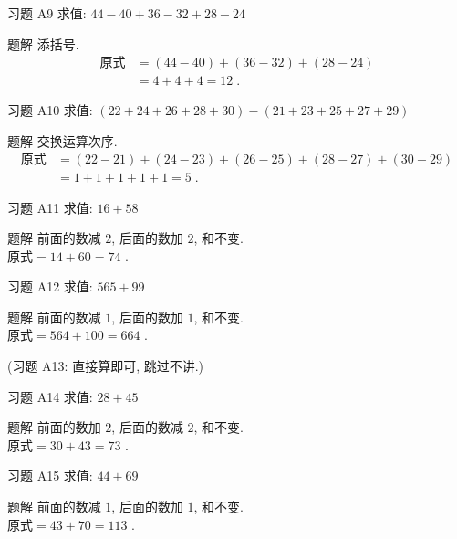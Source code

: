 \documentclass[content.tex]{subfiles}
\begin{document}
\begin{frame}{习题 A9}
求值: $44-40+36-32+28-24$
\begin{exampleblock}{题解}
添括号.
\begin{align*}
\text{原式} &= (44-40)+(36-32)+(28-24)\\
&=4+4+4=12\;.
\end{align*}
\end{exampleblock}
\end{frame}

\begin{frame}{习题 A10}
求值: $(22+24+26+28+30)-(21+23+25+27+29)$
\begin{exampleblock}{题解}
交换运算次序. 
\begin{align*}
\text{原式} &= (22-21)+(24-23)+(26-25)+(28-27)+(30-29)\\
&=1+1+1+1+1=5\;.
\end{align*}
\end{exampleblock}
\end{frame}

\begin{frame}{习题 A11}
求值: $16+58$
\begin{exampleblock}{题解}
前面的数减 $2$, 后面的数加 $2$, 和不变. \\
$\text{原式} = 14 + 60 = 74$ .
\end{exampleblock}
\end{frame}

\begin{frame}{习题 A12}
求值: $565+99$
\begin{exampleblock}{题解}
前面的数减 $1$, 后面的数加 $1$, 和不变. \\
$\text{原式} = 564 + 100 = 664$ .
\end{exampleblock}
\bigbreak
\centering (习题 A13: 直接算即可, 跳过不讲.)
\end{frame}

\begin{frame}{习题 A14}
求值: $28 + 45$
\begin{exampleblock}{题解}
前面的数加 $2$, 后面的数减 $2$, 和不变. \\
$\text{原式} = 30 + 43 = 73$ .
\end{exampleblock}
\end{frame}

\begin{frame}{习题 A15}
求值: $44+69$
\begin{exampleblock}{题解}
前面的数减 $1$, 后面的数加 $1$, 和不变. \\
$\text{原式} = 43 + 70 = 113$ .
\end{exampleblock}
\end{frame}
\end{document}
